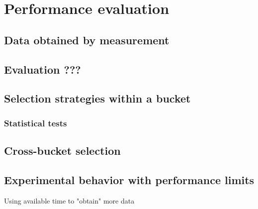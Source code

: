 \chapter{Performance evaluation}

\section{Data obtained by measurement}

\section{Evaluation ???}

\section{Selection strategies within a bucket}

\subsection{Statistical tests}

\section{Cross-bucket selection}

\section{Experimental behavior with performance limits}
Using available time to "obtain" more data

